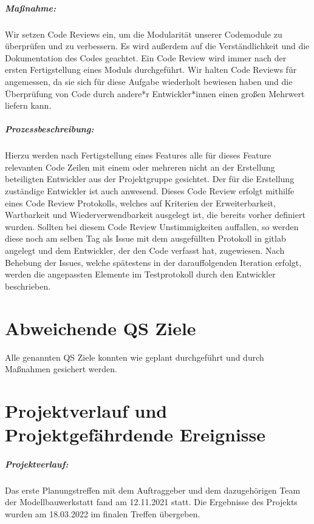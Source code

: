 \documentclass[
ngerman,
accentcolor=2d,
marginpar=false,
class=report,
fontsize=11pt,
ruledheaders=section,
]{tudapub}
\begin{document}
            \paragraph{Maßnahme:}
            Wir setzen Code Reviews ein, um die Modularität unserer Codemodule zu überprüfen und zu verbessern. Es wird außerdem auf die Verständlichkeit und die Dokumentation des Codes geachtet. Ein Code Review wird immer nach der ersten Fertigstellung eines Moduls durchgeführt.
            Wir halten Code Reviews für angemessen, da sie sich für diese Aufgabe wiederholt bewiesen haben und die Überprüfung von Code durch andere*r Entwickler*innen einen großen Mehrwert liefern kann.

            \paragraph{Prozessbeschreibung:}
            Hierzu werden nach Fertigstellung eines Features alle für dieses Feature relevanten Code Zeilen mit einem oder mehreren nicht an der Erstellung beteiligten Entwickler aus der Projektgruppe gesichtet. Der für die Erstellung zuständige Entwickler ist auch anwesend. Dieses Code Review erfolgt mithilfe eines Code Review Protokolls, welches auf Kriterien der Erweiterbarkeit, Wartbarkeit und Wiederverwendbarkeit ausgelegt ist, die bereits vorher definiert wurden. Sollten bei diesem Code Review Unstimmigkeiten auffallen, so werden diese noch am selben Tag als Issue mit dem ausgefüllten Protokoll in gitlab angelegt und dem Entwickler, der den Code verfasst hat, zugewiesen. Nach Behebung der Issues, welche spätestens in der darauffolgenden
            Iteration erfolgt, werden die angepassten Elemente im Testprotokoll durch den Entwickler beschrieben.


\chapter{Abweichende QS Ziele}
Alle genannten QS Ziele konnten wie geplant durchgeführt und durch Maßnahmen gesichert werden.


\chapter{Projektverlauf und Projektgefährdende Ereignisse}
\paragraph{Projektverlauf:}
\noindent
Das erste Planungstreffen mit dem Auftraggeber und dem dazugehörigen Team der Modellbauwerkstatt fand am 12.11.2021 statt.
Die Ergebnisse des Projekts wurden am 18.03.2022 im finalen Treffen übergeben.
\end{document}
